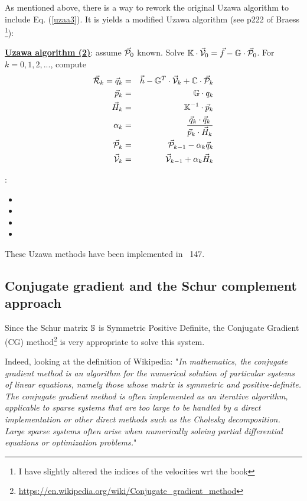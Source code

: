 As mentioned above, there is a way to rework the original Uzawa algorithm 
to include Eq. (\ref{uzaa3}). It is yields a modified 
Uzawa algorithm (see p222 of Braess \cite{braess}
\footnote{I have slightly 
altered the indices of the velocities wrt the book}):


\begin{mdframed}[backgroundcolor=blue!5]
\underline{\bf Uzawa algorithm (2)}: assume $\vec{\cal P}_0$ known. 
Solve $\mathbb{K}\cdot \vec{\cal V}_0 = \vec f - \mathbb{G}\cdot  \vec{\cal P}_0$. 
For $k=0,1,2,...$, compute 
\begin{eqnarray}
\vec{\cal R}_k=\vec q_k &=& \vec h-\mathbb{G}^T \cdot \vec{\cal V}_k + {\mathbb{C}} \cdot \vec{\cal P}_{k}\\
\vec{p}_k &=& {{\mathbb{G}}}\cdot q_k \\
\vec H_k &=& {{\mathbb{K}}}^{-1}\cdot \vec{p}_k \\
\alpha_k &=& \frac{\vec q_k \cdot \vec q_k}{\vec{p}_k \cdot \vec H_k} \\
\vec {\cal P}_k &=& \vec {\cal P}_{k-1} - \alpha_k  \vec q_k \\
\vec {\cal V}_{k} &=& \vec {\cal V}_{k-1} + \alpha_k  \vec H_k
\end{eqnarray}
\end{mdframed}


\Literature: \\
\begin{itemize}
\item
{}
\item
{}
\item
{}
\item
{}
\end{itemize}

These Uzawa methods have been implemented in \stone~147.


\newpage
\subsection{Conjugate gradient and the Schur complement approach }
\label{ss:schurpcg}

 
Since the Schur matrix ${\mathbb{S}}$ is Symmetric Positive Definite, 
the Conjugate Gradient (CG) 
method\footnote{\url{https://en.wikipedia.org/wiki/Conjugate_gradient_method}} \cite{hest52} 
is very appropriate to solve this system. 

Indeed, looking at the definition of Wikipedia: "{\it In mathematics, the conjugate 
gradient method is an algorithm for the numerical solution of particular systems of 
linear equations, namely those whose matrix is symmetric and positive-definite. 
The conjugate gradient method is often implemented as an iterative algorithm, applicable 
to sparse systems that are too large to be handled by a direct implementation or other 
direct methods such as the Cholesky decomposition. 
Large sparse systems often arise when numerically solving partial differential 
equations or optimization problems.}"

